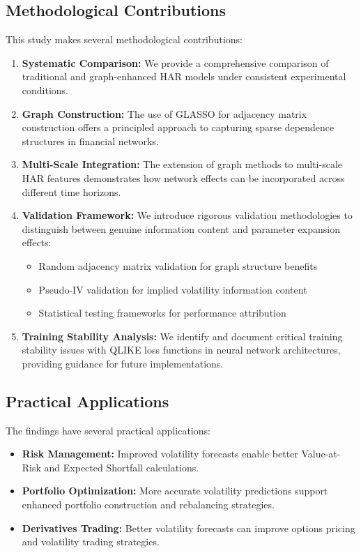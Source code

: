 \documentclass[12pt,a4paper]{article}
\begin{document}
\subsection{Methodological Contributions}

This study makes several methodological contributions:

\begin{enumerate}
\item \textbf{Systematic Comparison:} We provide a comprehensive comparison of traditional and graph-enhanced HAR models under consistent experimental conditions.

\item \textbf{Graph Construction:} The use of GLASSO for adjacency matrix construction offers a principled approach to capturing sparse dependence structures in financial networks.

\item \textbf{Multi-Scale Integration:} The extension of graph methods to multi-scale HAR features demonstrates how network effects can be incorporated across different time horizons.

\item \textbf{Validation Framework:} We introduce rigorous validation methodologies to distinguish between genuine information content and parameter expansion effects:
\begin{itemize}
\item Random adjacency matrix validation for graph structure benefits
\item Pseudo-IV validation for implied volatility information content
\item Statistical testing frameworks for performance attribution
\end{itemize}

\item \textbf{Training Stability Analysis:} We identify and document critical training stability issues with QLIKE loss functions in neural network architectures, providing guidance for future implementations.
\end{enumerate}

\subsection{Practical Applications}

The findings have several practical applications:

\begin{itemize}
\item \textbf{Risk Management:} Improved volatility forecasts enable better Value-at-Risk and Expected Shortfall calculations.
\item \textbf{Portfolio Optimization:} More accurate volatility predictions support enhanced portfolio construction and rebalancing strategies.
\item \textbf{Derivatives Trading:} Better volatility forecasts can improve options pricing and volatility trading strategies.
\end{itemize}
\end{document}
